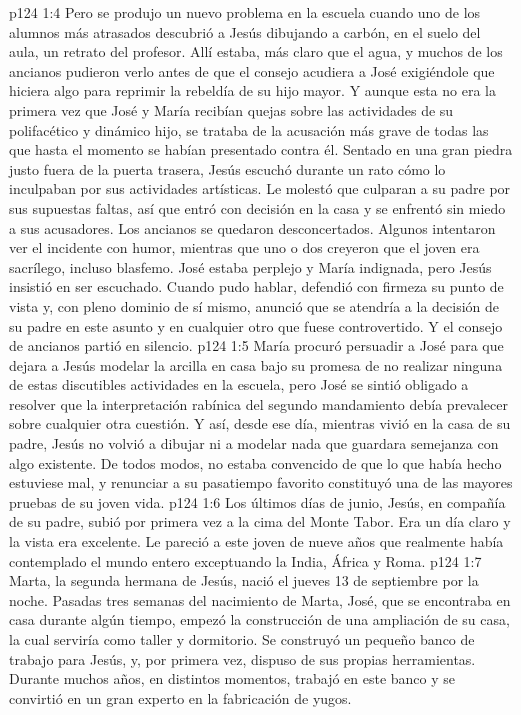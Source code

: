 \vs p124 1:4 Pero se produjo un nuevo problema en la escuela cuando uno de los alumnos más atrasados descubrió a Jesús dibujando a carbón, en el suelo del aula, un retrato del profesor. Allí estaba, más claro que el agua, y muchos de los ancianos pudieron verlo antes de que el consejo acudiera a José exigiéndole que hiciera algo para reprimir la rebeldía de su hijo mayor. Y aunque esta no era la primera vez que José y María recibían quejas sobre las actividades de su polifacético y dinámico hijo, se trataba de la acusación más grave de todas las que hasta el momento se habían presentado contra él. Sentado en una gran piedra justo fuera de la puerta trasera, Jesús escuchó durante un rato cómo lo inculpaban por sus actividades artísticas. Le molestó que culparan a su padre por sus supuestas faltas, así que entró con decisión en la casa y se enfrentó sin miedo a sus acusadores. Los ancianos se quedaron desconcertados. Algunos intentaron ver el incidente con humor, mientras que uno o dos creyeron que el joven era sacrílego, incluso blasfemo. José estaba perplejo y María indignada, pero Jesús insistió en ser escuchado. Cuando pudo hablar, defendió con firmeza su punto de vista y, con pleno dominio de sí mismo, anunció que se atendría a la decisión de su padre en este asunto y en cualquier otro que fuese controvertido. Y el consejo de ancianos partió en silencio.
\vs p124 1:5 María procuró persuadir a José para que dejara a Jesús modelar la arcilla en casa bajo su promesa de no realizar ninguna de estas discutibles actividades en la escuela, pero José se sintió obligado a resolver que la interpretación rabínica del segundo mandamiento debía prevalecer sobre cualquier otra cuestión. Y así, desde ese día, mientras vivió en la casa de su padre, Jesús no volvió a dibujar ni a modelar nada que guardara semejanza con algo existente. De todos modos, no estaba convencido de que lo que había hecho estuviese mal, y renunciar a su pasatiempo favorito constituyó una de las mayores pruebas de su joven vida.
\vs p124 1:6 \pc Los últimos días de junio, Jesús, en compañía de su padre, subió por primera vez a la cima del Monte Tabor. Era un día claro y la vista era excelente. Le pareció a este joven de nueve años que realmente había contemplado el mundo entero exceptuando la India, África y Roma.
\vs p124 1:7 \pc Marta, la segunda hermana de Jesús, nació el jueves 13 de septiembre por la noche. Pasadas tres semanas del nacimiento de Marta, José, que se encontraba en casa durante algún tiempo, empezó la construcción de una ampliación de su casa, la cual serviría como taller y dormitorio. Se construyó un pequeño banco de trabajo para Jesús, y, por primera vez, dispuso de sus propias herramientas. Durante muchos años, en distintos momentos, trabajó en este banco y se convirtió en un gran experto en la fabricación de yugos.

